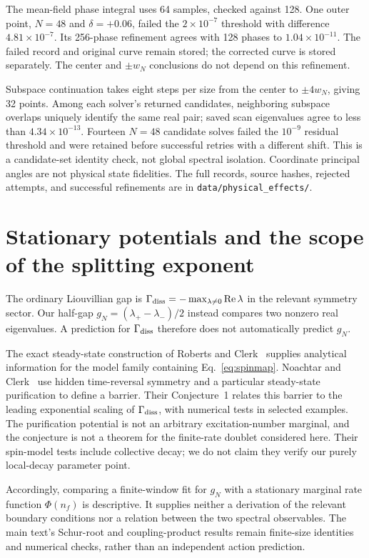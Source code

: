 \documentclass[aps,pra,10pt,onecolumn,superscriptaddress,amsmath,amssymb]{revtex4-2}
\begin{document}
The mean-field phase integral uses 64 samples, checked against 128. One outer point, $N=48$ and $\delta=+0.06$, failed the $2\times10^{-7}$ threshold with difference $4.81\times10^{-7}$. Its 256-phase refinement agrees with 128 phases to $1.04\times10^{-11}$. The failed record and original curve remain stored; the corrected curve is stored separately. The center and $\pm w_N$ conclusions do not depend on this refinement.

Subspace continuation takes eight steps per size from the center to $\pm4w_N$, giving 32 points. Among each solver's returned candidates, neighboring subspace overlaps uniquely identify the same real pair; saved scan eigenvalues agree to less than $4.34\times10^{-13}$. Fourteen $N=48$ candidate solves failed the $10^{-9}$ residual threshold and were retained before successful retries with a different shift. This is a candidate-set identity check, not global spectral isolation. Coordinate principal angles are not physical state fidelities. The full records, source hashes, rejected attempts, and successful refinements are in \texttt{data/physical\_effects/}.

\section{Stationary potentials and the scope of the splitting exponent}
The ordinary Liouvillian gap is $\Gamma_{\rm diss}=-\max_{\lambda\ne0}\operatorname{Re}\lambda$ in the relevant symmetry sector. Our half-gap $g_N=(\lambda_+-\lambda_-)/2$ instead compares two nonzero real eigenvalues. A prediction for $\Gamma_{\rm diss}$ therefore does not automatically predict $g_N$.

The exact steady-state construction of Roberts and Clerk~\cite{RobertsClerk2023} supplies analytical information for the model family containing Eq.~\eqref{eq:spinmap}. Noachtar and Clerk~\cite{NoachtarClerk2026} use hidden time-reversal symmetry and a particular steady-state purification to define a barrier. Their Conjecture~1 relates this barrier to the leading exponential scaling of $\Gamma_{\rm diss}$, with numerical tests in selected examples. The purification potential is not an arbitrary excitation-number marginal, and the conjecture is not a theorem for the finite-rate doublet considered here. Their spin-model tests include collective decay; we do not claim they verify our purely local-decay parameter point.

Accordingly, comparing a finite-window fit for $g_N$ with a stationary marginal rate function $\Phi(n_f)$ is descriptive. It supplies neither a derivation of the relevant boundary conditions nor a relation between the two spectral observables. The main text's Schur-root and coupling-product results remain finite-size identities and numerical checks, rather than an independent action prediction.
\end{document}
